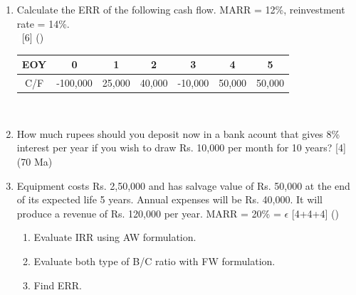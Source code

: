\documentclass[12pt]{article}
\newcommand{\enter}{\\\textcolor{white}{1}}
\begin{document}
\begin{enumerate}[noitemsep, topsep = 0pt]
		\item Calculate the ERR of the following cash flow. MARR = 12\%, reinvestment rate = 14\%.
		\enter\hfill [6] ()\\
		\begin{tabular}{|c|c|c|c|c|c|c|}
			\hline
			EOY & 0 & 1 & 2 & 3 & 4 & 5\\ \hline
			C/F & -100,000 & 25,000 & 40,000 & -10,000 & 50,000 & 50,000 \\ \hline
		\end{tabular}\\[0pt]
		
		\item How much rupees should you deposit now in a bank acount that gives 8\% interest per year if you wish to draw Rs. 10,000 per month for 10 years? \hfill [4] (70 Ma)
		
		\item Equipment costs Rs. 2,50,000 and has salvage value of Rs. 50,000 at the end of its expected life 5 years. Annual expenses will be Rs. 40,000. It will produce a revenue of Rs. 120,000 per year. MARR = 20\% = $\epsilon$ \hfill [4+4+4] ()
		\begin{enumerate}[noitemsep, topsep = 0pt, label = \alph*.]
			\item Evaluate IRR using AW formulation.
			\item Evaluate both type of B/C ratio with FW formulation.
			\item Find ERR.
		\end{enumerate}
	\end{enumerate}
\end{document}
